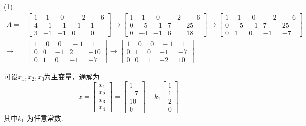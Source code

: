 (1)
\begin{displaymath}
\begin{aligned}
A=&\begin{bmatrix} 1&\ \ 1&\ \ 0&\ -2&\ -6\\4&-1&-1&-1&1\\3&-1&-1&0&0 \end{bmatrix}\rightarrow
\begin{bmatrix} 1&\ \ 1&\ \ 0&\ -2&\ -6\\0&-5&-1&7&25\\0&-4&-1&6&18 \end{bmatrix}\rightarrow
\begin{bmatrix} 1&\ \ 1&\ \ 0&\ -2&\ -6\\0&-5&-1&7&25\\0&1&0&-1&-7 \end{bmatrix}\\ \rightarrow &
\begin{bmatrix}1&\ \ 0&\ \ 0&\ -1&\ \ 1\\0&0&-1&2&-10\\0&1&0&-1&-7  \end{bmatrix} \rightarrow
\begin{bmatrix}1&\ \ 0&\ \ 0&\ -1& \ \ 1\\0&1&0&-1&-7\\0&0&1&-2&10  \end{bmatrix}
\end{aligned} \end{displaymath}

可设$x_1,x_2,x_3$为主变量，通解为
\begin{displaymath}
x=\begin{bmatrix}x_1\\x_2\\x_3\\x_4\end{bmatrix}=\begin{bmatrix}1\\-7\\10\\0\end{bmatrix}
+k_1\begin{bmatrix}1\\1\\2\\0\end{bmatrix}
\end{displaymath}
其中$k_1$ 为任意常数.

